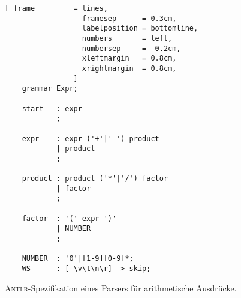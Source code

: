 \begin{figure}[!ht]
\centering
\begin{Verbatim}[ frame         = lines, 
                  framesep      = 0.3cm, 
                  labelposition = bottomline,
                  numbers       = left,
                  numbersep     = -0.2cm,
                  xleftmargin   = 0.8cm,
                  xrightmargin  = 0.8cm,
                ]
    grammar Expr;
    
    start   : expr
            ;
    
    expr    : expr ('+'|'-') product 
            | product        
            ;
    
    product : product ('*'|'/') factor 
            | factor
            ;
    
    factor  : '(' expr ')'
            | NUMBER
            ;
    
    NUMBER  : '0'|[1-9][0-9]*;
    WS      : [ \v\t\n\r] -> skip;
\end{Verbatim}
\vspace*{-0.3cm}
\caption{\textsc{Antlr}-Spezifikation eines Parsers f\"ur arithmetische Ausdr\"ucke.}
\label{fig:Expr.g4}
\end{figure}



